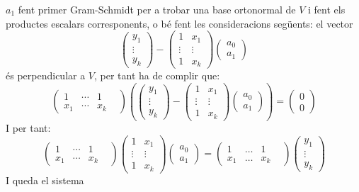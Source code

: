 \documentclass[
  11pt,
]{book}
\numberwithin{dummy}{section}
\theoremstyle{maincolornumbox}
\theoremstyle{blacknumex}
\theoremstyle{blacknumbox}
\theoremstyle{maincolornum}
\newlength\esp
\begin{document}
\(a_1\) fent primer Gram-Schmidt per a trobar una base ortonormal de \(V\) i
fent els productes escalars corresponents, o bé fent les consideracions
següents: el vector
\[\begin{pmatrix} y_1 \\ \vdots \\ y_k \end{pmatrix} -
\begin{pmatrix} 1 & x_1 \\ \vdots & \vdots \\ 1 & x_k \end{pmatrix}
\begin{pmatrix} a_0 \\ a_1 \end{pmatrix}\] és perpendicular a \(V\), per
tant ha de complir que: \[\begin{pmatrix}
1 & \cdots & 1 & \\ x_1 & \cdots & x_k
\end{pmatrix}
\left(
\begin{pmatrix} y_1 \\ \vdots \\ y_k \end{pmatrix} -
\begin{pmatrix} 1 & x_1 \\ \vdots & \vdots \\ 1 & x_k \end{pmatrix}
\begin{pmatrix} a_0 \\ a_1 \end{pmatrix}\right) = \begin{pmatrix} 0 \\ 0 \end{pmatrix}\]
I per tant: \[\begin{pmatrix}
1 & \cdots & 1 & \\ x_1 & \cdots & x_k
\end{pmatrix}
\begin{pmatrix} 1 & x_1 \\ \vdots & \vdots \\ 1 & x_k \end{pmatrix}
\begin{pmatrix} a_0 \\ a_1 \end{pmatrix} = 
\begin{pmatrix}
1 & \dots & 1 & \\ x_1 & \dots & x_k
\end{pmatrix}
\begin{pmatrix} y_1 \\ \vdots \\ y_k \end{pmatrix}\] I queda el sistema
\end{document}
